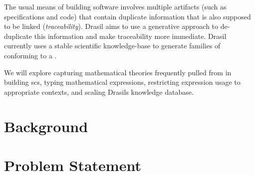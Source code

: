The usual means of building software involves multiple artifacts (such as
specifications and code) that contain duplicate information that is also
supposed to be linked (\textit{traceability}). Drasil aims to use a generative
approach to de-duplicate this information and make traceability more immediate.
Drasil currently uses a stable scientific knowledge-base to generate families of
 conforming to a \cite{SmithAndLai2005}.

\iffalse
      The usual means of building software involves multiple artifacts (such as
      specifications and code) that contain duplicate information that is
      supposed to be linked (\textit{traceability}). Drasil aims to capture the
      information and knowledge necessary to create these artifacts, and
      re-generate the artifacts, making traceability more immediate.

      A common thread of knowledge links together all software artifacts.
      Software developers pull on this thread to produce software artifacts, but
      the thread is lost on the authors, isn't effectively shared, and artifacts
      quickly becomes out of date as more is understood or requirements changed.
      Typically, this knowledge is duplicated across many artifacts (such as
      specifications and code). Through codifying domain knowledge,
      Drasil\cite{Drasil2021} aims to use a generative approach to
      \textit{de-duplicate} this information, and generate software artifacts
      that are \textit{traceable}, \textit{reusable}, \textit{maintainable}, and
      \textit{consistent}, against a stable body of knowledge. Drasil currently
      focuses on \ACF{scs} conforming to a specific \ACF{srs}
      template\cite{SmithAndLai2005}.
\fi

We will explore capturing mathematical theories frequently pulled from in
building \acs{scs}, typing mathematical expressions, restricting expression
usage to appropriate contexts, and scaling Drasils knowledge database.

\section{Background}
\label{sec:intro:background}


\section{Problem Statement}
\label{sec:intro:problemStatement}

